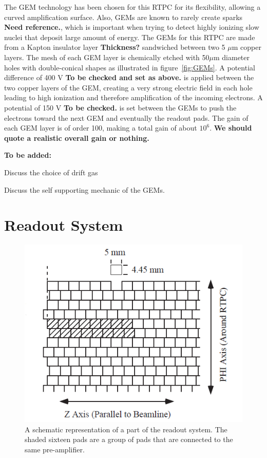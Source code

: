 \documentclass[twocolumn,showpacs,superscriptaddress,groupedaddress]{revtex4}
\begin{document}
The GEM technology has been chosen for this RTPC for its flexibility, 
allowing a curved amplification surface. Also, GEMs are known to rarely create 
sparks{\bf \color{red} Need reference.}, which is important when trying to 
detect highly ionizing slow nuclei that deposit large amount of energy. The 
GEMs for this RTPC are made from a Kapton insulator layer 
{\bf \color{red} Thickness?} sandwiched between two 5 $\mu$m copper
layers. The mesh of each GEM layer is chemically etched with 50$\mu$m diameter
holes with double-conical shapes as illustrated in figure~\ref{fig:GEMs}. A
potential difference of 400 V {\bf \color{red} To be checked and set as above.} 
is applied between the two copper layers of the
GEM, creating a very strong electric field in each hole leading to high ionization 
and therefore amplification of the incoming electrons. A 
potential of 150 V {\bf \color{red} To be checked.} 
is set between the GEMs to push the electrons toward the next GEM and eventually 
the readout pads. The gain of each GEM layer is of order 100, making a total gain 
of about $10^{6}$. {\bf \color{red} We should quote a realistic overall gain or nothing.}\\

{\bf \color{red} To be added:

Discuss the choice of drift gas

Discuss the self supporting mechanic of the GEMs.}

\section{Readout System} \label{sec_readout}

\begin{figure}[tb]
   \centering
   \includegraphics[scale=0.55]{fig/PADs.png}
   \caption[]{A schematic representation of a part of the readout system.  The 
   shaded sixteen pads are a group of pads that are connected to the same 
pre-amplifier.} \label{fig:PADs}
\end{figure}
\end{document}
